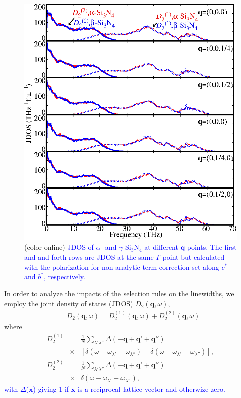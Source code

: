 \documentclass[twocolumn,amsmath,amssymb,a4paper,prb,superscriptaddress,floatfix]{revtex4-1}
\begin{document}
\begin{figure}[ht]
 \centering
  \includegraphics[width=0.9\linewidth]{figure_jdoss.eps} \caption{(color
	  online) \textcolor{blue}{JDOS of $\alpha$- and $\gamma$-Si$_3$N$_4$ at different $\mathbf q$ points.
  The first and and forth rows are JDOS at the same $\Gamma$-point but calculated with the polarization for non-analytic term correction set along $c^*$ and $b^*$, respectively.} \label{fig:Fig6_338} }
 \centering
\end{figure}


In order to analyze the impacts of the selection rules on
the linewidths, we employ the joint density of states (JDOS)
${D_2(\mathbf{q},\omega)}$,
\begin{align}
 \label{eq:jdos}
 &D_2(\mathbf{q},\omega) = D_2^{(1)}(\mathbf{q},\omega) +  D_2^{(2)}(\mathbf{q},\omega)
\end{align}
where 
\begin{eqnarray*}
	D_2^{(1)} & = & \frac{1}{N} \sum_{\lambda'\lambda''}\Delta(-\mathbf{q} + \mathbf{q'} + \mathbf{q''}) \nonumber \\
								   & \times & [\delta(\omega + \omega_{\lambda'} - \omega_{\lambda''}) + \delta(\omega - \omega_{\lambda'} + \omega_{\lambda''})],\\
	D_2^{(2)} & = & \frac{1}{N} \sum_{\lambda'\lambda''}\Delta(-\mathbf{q} + \mathbf{q'} + \mathbf{q''}) \nonumber \\
								   & \times & \delta(\omega - \omega_{\lambda'} - \omega_{\lambda''}),
\end{eqnarray*}
\textcolor{blue}{with $\Delta$($\mathbf{x}$) giving 1 if $\mathbf{x}$ is a reciprocal lattice vector and otherwize zero.}
\end{document}
